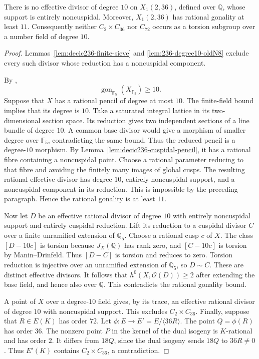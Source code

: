 \begin{proposition}\label{prop:decic236-excluded}
There is no effective divisor of degree $10$ on $X_1(2,36)$,
defined over $\mathbb Q$, whose support is entirely noncuspidal.
Moreover, $X_1(2,36)$ has rational gonality at least $11$.
Consequently neither $C_2\times C_{36}$ nor $C_{72}$ occurs as
a torsion subgroup over a number field of degree $10$.
\end{proposition}
\begin{proof}
Lemmas~\ref{lem:decic236-finite-sieve} and
\ref{lem:236-degree10-oldN8} exclude every such divisor whose
reduction has a noncuspidal component.

By \cite[Table~1, the entry for $X_1(2,36)$ at $5$]{NV},
\[
 \operatorname{gon}_{\mathbb F_5}(X_{\mathbb F_5})\geq10.
\]
Suppose that $X$ has a rational pencil of degree at most $10$.
The finite-field bound implies that its degree is $10$.
Take a saturated integral lattice in its two-dimensional section
space. Its reduction gives two independent sections of a
line bundle of degree $10$.
A common base divisor would give a morphism of smaller degree
over $\mathbb F_5$, contradicting the same bound.
Thus the reduced pencil is a degree-$10$ morphism.
By Lemma~\ref{lem:decic236-cuspidal-pencil}, it has a rational
fibre containing a noncuspidal point.
Choose a rational parameter reducing to that fibre and avoiding
the finitely many images of global cusps.
The resulting rational effective divisor has degree $10$,
entirely noncuspidal support, and a noncuspidal component in its
reduction. This is impossible by the preceding paragraph.
Hence the rational gonality is at least $11$.

Now let $D$ be an effective rational divisor of degree $10$
with entirely noncuspidal support and entirely cuspidal reduction.
Lift its reduction to a cuspidal divisor $C$ over a finite
unramified extension of $\mathbb Q_5$.
Choose a rational cusp $c$ of $X$.
The class $[D-10c]$ is torsion because $J_X(\mathbb Q)$ has
rank zero, and $[C-10c]$ is torsion by Manin--Drinfeld.
Thus $[D-C]$ is torsion and reduces to zero.
Torsion reduction is injective over an unramified extension of
$\mathbb Q_5$, so $D\sim C$.
These are distinct effective divisors. It follows that
$h^0(X,\mathcal O(D))\geq2$ after extending the base field,
and hence also over $\mathbb Q$.
This contradicts the rational gonality bound.

A point of $X$ over a degree-$10$ field gives, by its trace, an
effective rational divisor of degree $10$ with noncuspidal
support. This excludes $C_2\times C_{36}$.
Finally, suppose that $R\in E(K)$ has order $72$.
Let $\phi:E\to E'=E/\langle36R\rangle$.
The point $Q=\phi(R)$ has order $36$.
The nonzero point $P$ in the kernel of the dual isogeny is
$K$-rational and has order $2$.
It differs from $18Q$, since the dual isogeny sends $18Q$ to
$36R\ne0$.
Thus $E'(K)$ contains $C_2\times C_{36}$, a contradiction.
\end{proof}
